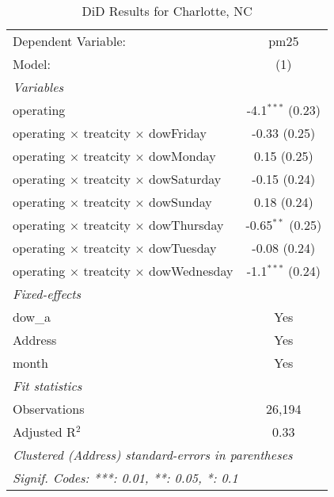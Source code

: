 
\begin{table}[htbp]
   \caption{DiD Results for Charlotte, NC}
   \centering
   \begin{tabular}{lc}
      \tabularnewline \midrule \midrule
      Dependent Variable:                                  & pm25\\  
      Model:                                               & (1)\\  
      \midrule
      \emph{Variables}\\
      operating                                            & -4.1$^{***}$ (0.23)\\   
      operating $\times$ treatcity $\times$ dowFriday      & -0.33 (0.25)\\   
      operating $\times$ treatcity $\times$ dowMonday      & 0.15 (0.25)\\   
      operating $\times$ treatcity $\times$ dowSaturday    & -0.15 (0.24)\\   
      operating $\times$ treatcity $\times$ dowSunday      & 0.18 (0.24)\\   
      operating $\times$ treatcity $\times$ dowThursday    & -0.65$^{**}$ (0.25)\\   
      operating $\times$ treatcity $\times$ dowTuesday     & -0.08 (0.24)\\   
      operating $\times$ treatcity $\times$ dowWednesday   & -1.1$^{***}$ (0.24)\\   
      \midrule
      \emph{Fixed-effects}\\
      dow\_a                                               & Yes\\  
      Address                                              & Yes\\  
      month                                                & Yes\\  
      \midrule
      \emph{Fit statistics}\\
      Observations                                         & 26,194\\  
      Adjusted R$^2$                                       & 0.33\\  
      \midrule \midrule
      \multicolumn{2}{l}{\emph{Clustered (Address) standard-errors in parentheses}}\\
      \multicolumn{2}{l}{\emph{Signif. Codes: ***: 0.01, **: 0.05, *: 0.1}}\\
   \end{tabular}
\end{table}


